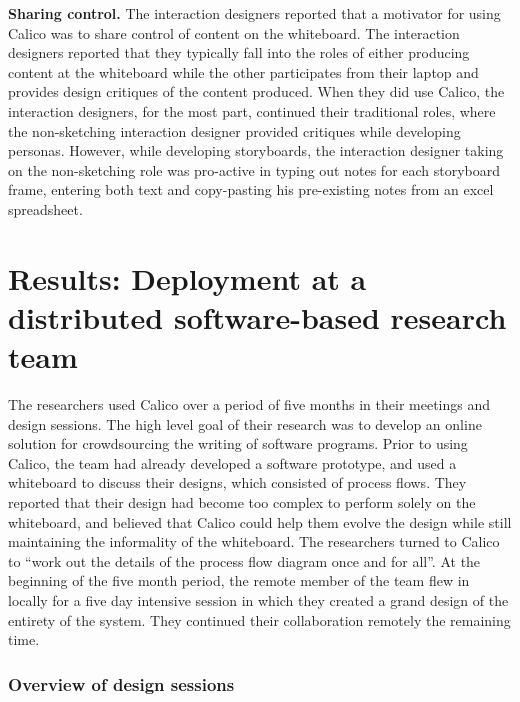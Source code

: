 \textbf{Sharing control.} The interaction designers reported that a motivator for using Calico was to share control of content on the whiteboard. The interaction designers reported that they typically fall into the roles of either producing content at the whiteboard while the other participates from their laptop and provides design critiques of the content produced. When they did use Calico, the interaction designers, for the most part, continued their traditional roles, where the non-sketching interaction designer provided critiques while developing personas. However, while developing storyboards, the interaction designer taking on the non-sketching role was pro-active in typing out notes for each storyboard frame, entering both text and copy-pasting his pre-existing notes from an excel spreadsheet.

\section{Results: Deployment at a distributed software-based research team}
\label{chapter:evaluation:deployment3}

The researchers used Calico over a period of five months in their meetings and design sessions. The high level goal of their research was to develop an online solution for crowdsourcing the writing of software programs. Prior to using Calico, the team had already developed a software prototype, and used a whiteboard to discuss their designs, which consisted of process flows. They reported that their design had become too complex to perform solely on the whiteboard, and believed that Calico could help them evolve the design while still maintaining the informality of the whiteboard. The researchers turned to Calico to ``work out the details of the process flow diagram once and for all''. At the beginning of the five month period, the remote member of the team flew in locally for a five day intensive session in which they created a grand design of the entirety of the system. They continued their collaboration remotely the remaining time. 

\subsubsection{Overview of design sessions}

